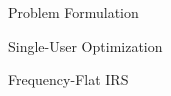 \documentclass{IEEEtran}
\begin{document}
\begin{section}{Problem Formulation}
\begin{subsection}{Single-User Optimization}
\begin{subsubsection}{Frequency-Flat IRS}
		\end{subsubsection}



\end{subsection}
\end{section}
\end{document}
